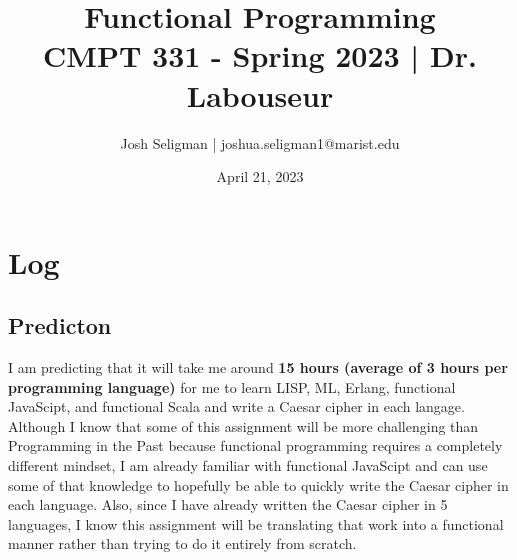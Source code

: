 \documentclass[letterpaper, 10pt, DIV=13]{scrartcl}
\title {
	\normalfont
	\huge{Functional Programming} \\
	\vspace{10pt}
	\large{CMPT 331 - Spring 2023 | Dr. Labouseur}
}
\author{\normalfont Josh Seligman | joshua.seligman1@marist.edu}
\date{\normalfont April 21, 2023}
\numberwithin{equation}{section}
\numberwithin{figure}{section}
\numberwithin{table}{section}
\begin{document}
\maketitle

\section{Log}
\subsection{Predicton}
I am predicting that it will take me around \textbf{15 hours (average of 3 hours per programming language)} for me to learn LISP, ML, Erlang, 
functional JavaScipt, and functional Scala and write a Caesar cipher in each langage. Although I know that some of this assignment will be more 
challenging than Programming in the Past because functional programming requires a completely different mindset, I am already familiar with 
functional JavaScipt and can use some of that knowledge to hopefully be able to quickly write the Caesar cipher in each language. Also, since I 
have already written the Caesar cipher in 5 languages, I know this assignment will be translating that work into a functional manner rather than 
trying to do it entirely from scratch. 
\end{document}
